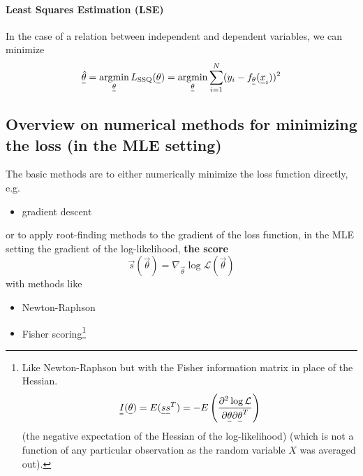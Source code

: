 \paragraph*{Least Squares Estimation (LSE)} In the case of a relation between independent and dependent variables,
we can minimize
\begin{equation}
    \vec{\hat{\theta}} = \argmin_{\vec{\theta}} L_\text{SSQ}(\vec{\theta}) = \argmin_{\vec{\theta}} \sum_{i=1}^N (y_i - f_\vec{\theta}(\vec{x}_i))^2
\end{equation}


\subsection{Overview on numerical methods for minimizing the loss (in the MLE setting)}
The basic methods are to either numerically minimize the loss function directly, e.g.
\begin{itemize}
    \item gradient descent
\end{itemize}
or to apply root-finding methods to the gradient of the loss function, in the MLE
setting the gradient of the log-likelihood, \textbf{the score}
\begin{equation}
    \vec{s}(\vec{\theta}) = \nabla_{\vec{\theta}} \log \mathcal{L}(\vec{\theta})
\end{equation}
with methods like
\begin{itemize}
    \item Newton-Raphson
    \item Fisher scoring\footnote{Like Newton-Raphson but with the Fisher information matrix in place of the Hessian.
    \begin{equation}
        \mat{I}(\vec{\theta}) = E(\vec{s} \vec{s}^T) =-E \left( \frac{\partial^2 \log \mathcal{L}}{\partial \vec{\theta} \partial \vec{\theta}^T} \right)
    \end{equation}
    (the negative expectation of the Hessian of the log-likelihood)
    (which is not a function of any particular observation as the random variable $X$ was 
    averaged out).}
\end{itemize}

